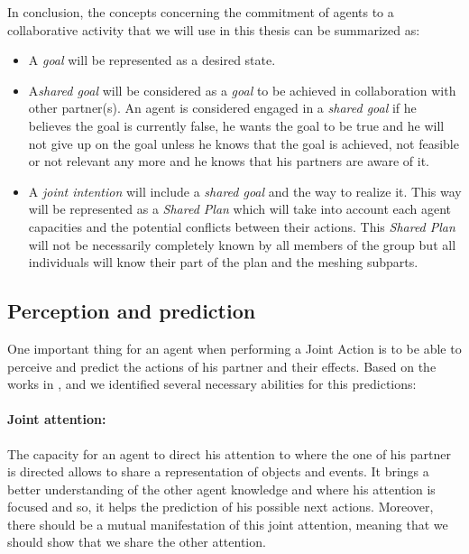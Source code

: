 \documentclass[english,a4paper,11pt,twoside]{StyleThese}
\begin{document}
In conclusion, the concepts concerning the commitment of agents to a collaborative activity that we will use in this thesis can be summarized as:
\begin{itemize}
\item A \textit{goal} will be represented as a desired state.
\item A\textit{shared goal} will be considered as a \textit{goal} to be achieved in collaboration with other partner(s). An agent is considered engaged in a \textit{shared goal} if he believes the goal is currently false, he wants the goal to be true and he will not give up on the goal unless he knows that the goal is achieved, not feasible or not relevant any more and he knows that his partners are aware of it.
\item A \textit{joint intention} will include a \textit{shared goal} and the way to realize it. This way will be represented as a \textit{Shared Plan} which will take into account each agent capacities and the potential conflicts between their actions. This \textit{Shared Plan} will not be necessarily completely known by all members of the group but all individuals will know their part of the plan and the meshing subparts.
\end{itemize}


\subsection{Perception and prediction}

\label{subsec:prediction}

One important thing for an agent when performing a Joint Action is to be able to perceive and predict the actions of his partner and their effects. Based on the works in \cite{sebanz2006joint}, \cite{pacherie2011phenomenology} and \cite{obhi2011moving} we identified several necessary abilities for this predictions:

\paragraph{Joint attention:} The capacity for an agent to direct his attention to where the one of his partner is directed allows to share a representation of objects and events. It brings a better understanding of the other agent knowledge and where his attention is focused and so, it helps the prediction of his possible next actions. Moreover, there should be a mutual manifestation of this joint attention, meaning that we should show that we share the other attention. 
\end{document}
